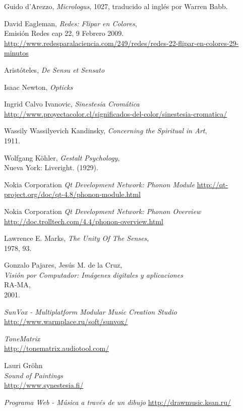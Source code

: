 \begin{thebibliography}{9}
 Guido d'Arezzo,
 \emph{Micrologus},
 1027,
 traducido al inglés por Warren Babb.

 David Eagleman,
 \emph{Redes: Flipar en Colores},\\
 Emisión Redes cap 22, 9 Febrero 2009.\\
 \url{http://www.redesparalaciencia.com/249/redes/redes-22-flipar-en-colores-29-minutos}

 Aristóteles,
 \emph{De Sensu et Sensato}

 Isaac Newton,
 \emph{Opticks}

 Ingrid Calvo Ivanovic,
 \emph{Sinestesia Cromática}
 \url{http://www.proyectacolor.cl/significados-del-color/sinestesia-cromatica/}

 Wassily Wassilyevich Kandinsky,
 \emph{Concerning the Spiritual in Art},\\
 1911.

 Wolfgang Köhler,
 \emph{Gestalt Psychology},\\
 Nueva York: Liveright. (1929).

 Nokia Corporation
 \emph{Qt Development Network: Phonon Module}
 \url{http://qt-project.org/doc/qt-4.8/phonon-module.html}
 
 Nokia Corporation
 \emph{Qt Development Network: Phonon Overview}
 \url{http://doc.trolltech.com/4.4/phonon-overview.html}

 Lawrence E. Marks,
 \emph{The Unity Of The Senses},\\
 1978, 93.

 Gonzalo Pajares, Jesús M. de la Cruz,\\
 \emph{Visión por Computador: Imágenes digitales y aplicaciones}\\
 RA-MA,\\
 2001.

\emph{SunVox - Multiplatform Modular Music Creation Studio}\\
\url{http://www.warmplace.ru/soft/sunvox/}

\emph{ToneMatrix}\\
\url{http://tonematrix.audiotool.com/}

Lauri Gröhn\\
\emph{Sound of Paintings}\\
\url{http://www.synestesia.fi/}

\emph{Programa Web - Música a través de un dibujo}
\url{http://drawmusic.ksan.ru/}
\end{thebibliography}